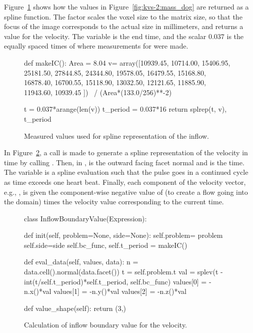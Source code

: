Figure~\ref{fig:kvs-2:inflow_codeI} shows how the values in
Figure~\ref{fig:kvs-2:mass_dog} are returned as a spline function. The
factor  scales the voxel size to the matrix size,
so that the focus of the image corresponds to the actual size in
millimeters, and returns a value for the velocity. The 
variable is the end time, and the scalar $0.037$ is the equally spaced
times of where measurements for  were made.

\begin{figure}
  \begin{center}
    \begin{python}
def makeIC():
    Area = 8.04
    v= array([10939.45, 10714.00, 15406.95,
              25181.50, 27844.85, 24344.80,
              19578.05, 16479.55, 15168.80,
              16878.40, 16700.55, 15118.90,
              13032.50, 12121.65, 11885.90,
              11943.60, 10939.45 ]) \
                    / (Area*(133.0/256)**-2)

    t = 0.037*arange(len(v))
    t_period = 0.037*16
    return splrep(t, v), t_period
    \end{python}
  \end{center}
    \caption{Measured values used for spline representation of the inflow.}
    \label{fig:kvs-2:inflow_codeI}
\end{figure}

In Figure~\ref{fig:kvs-2:inflow_codeII}, a call is made to generate a spline
representation of the velocity in time by calling \emp{makeIC()}.
Then, in \emp{eval\_data}, \emp{n} is the outward facing facet normal
and \emp{t} is the time. The variable \emp{val} is a spline evaluation
such that the pulse goes in a continued cycle as time exceeds one
heart beat. Finally, each component of the velocity vector, e.g.,
\emp{values[0]}, is given the component-wise negative value of 
(to create a flow going into the domain) times the velocity value
corresponding to the current time.

\begin{figure}
  \begin{center}
    \begin{python}
class InflowBoundaryValue(Expression):

    def init(self, problem=None, side=None):
        self.problem= problem
        self.side=side
        self.bc_func, self.t_period = makeIC()

    def eval_data(self, values, data):
        n = data.cell().normal(data.facet())
        t = self.problem.t
        val =  splev(t - int(t/self.t_period)*self.t_period, self.bc_func)
        values[0] = -n.x()*val
        values[1] = -n.y()*val
        values[2] = -n.z()*val

    def value_shape(self):
        return (3,)
    \end{python}
  \end{center}
    \caption{Calculation of inflow boundary value for the velocity.}
    \label{fig:kvs-2:inflow_codeII}
\end{figure}

